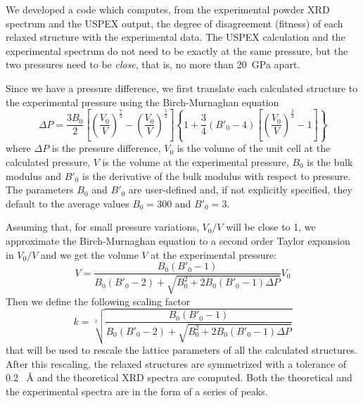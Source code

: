 \documentclass{article}
\begin{document}
We developed a code which computes, from the experimental powder XRD spectrum and the USPEX output, the degree of disagreement (fitness) of each relaxed structure with the experimental data. The USPEX calculation and the experimental spectrum do not need to be exactly at the same pressure, but the two pressures need to be \emph{close}, that is, no more than \SI{20}{GPa} apart.

Since we have a pressure difference, we first translate each calculated structure to the experimental pressure using the Birch-Murnaghan equation
\begin{equation*}
	\Delta P = \frac{3 B_0}{2} \left[ \left( \frac{V_0}{V} \right)^{\frac{7}{3}} - \left( \frac{V_0}{V} \right)^{\frac{5}{3}} \right] \left\{ 1 + \frac{3}{4} \left( B'_0 - 4 \right) \left[ \left( \frac{V_0}{V} \right)^{\frac{2}{3}} - 1 \right] \right\}
\end{equation*}
where $\Delta P$ is the pressure difference, $V_0$ is the volume of the unit cell at the calculated pressure, $V$ is the volume at the experimental pressure, $B_0$ is the bulk modulus and $B'_0$ is the derivative of the bulk modulus with respect to pressure. The parameters $B_0$ and $B'_0$ are user-defined and, if not explicitly specified, they default to the average values $B_0 = 300$ and $B'_0 = 3$. 

Assuming that, for small pressure variations, $V_0/V$ will be close to 1, we approximate the Birch-Murnaghan equation to a second order Taylor expansion in $V_0/V$ and we get the volume $V$ at the experimental pressure:
\begin{equation*}
	V = \frac{B_0 (B'_0 - 1)}{B_0 (B'_0 - 2) + \sqrt{B_0^2 + 2 B_0 (B'_0 - 1) \Delta P}} V_0
\end{equation*}
Then we define the following scaling factor
\begin{equation*}
	k = \sqrt[3]{\frac{B_0 (B'_0 - 1)}{B_0 (B'_0 - 2) + \sqrt{B_0^2 + 2 B_0 (B'_0 - 1) \Delta P}}}
\end{equation*}
that will be used to rescale the lattice parameters of all the calculated structures. After this rescaling, the relaxed structures are symmetrized with a tolerance of 0.2 \SI{}{\angstrom} and the theoretical XRD spectra are computed. Both the theoretical and the experimental spectra are in the form of a series of peaks.
\end{document}
